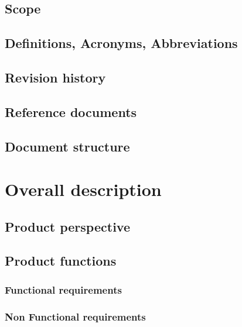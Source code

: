 \documentclass[a4paper,oneside,11pt]{article}
\begin{document}
        \subsection{Scope}
            
        \subsection{Definitions, Acronyms, Abbreviations}
            
                \newpage
        \subsection{Revision history}
         
             \newpage
        \subsection{Reference documents}
            
        \subsection{Document structure}
        
        
    \newpage
    \section{Overall description}
        \subsection{Product perspective}
            
        \subsection{Product functions}
            
            \subsubsection{Functional requirements}
            
            \subsubsection{Non Functional requirements}
            
\end{document}
